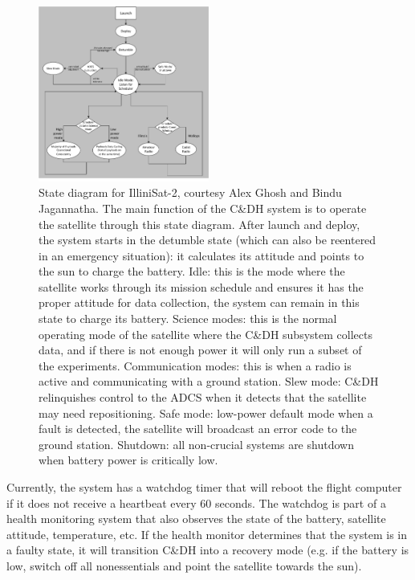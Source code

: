 \begin{figure}
  \centering
  \includegraphics[width=0.5\textwidth]{images/state_machine}
  \caption{State diagram for IlliniSat-2, courtesy Alex Ghosh and Bindu
  Jagannatha. The main function of the C\&DH system is to operate the satellite
  through this state diagram. After launch and deploy, the system starts in the
  detumble state (which can also be reentered in an emergency situation): it
  calculates its attitude and points to the sun to charge the battery.  Idle:
  this is the mode where the satellite works through its mission schedule and
  ensures it has the proper attitude for data collection, the system can remain
  in this state to charge its battery.  Science modes: this is the normal
  operating mode of the satellite where the C\&DH subsystem collects data, and
  if there is not enough power it will only run a subset of the experiments.
  Communication modes: this is when a radio is active and communicating with a
  ground station. Slew mode: C\&DH relinquishes control to the ADCS when it
  detects that the satellite may need repositioning.  Safe mode: low-power
  default mode when a fault is detected, the satellite will broadcast an error
  code to the ground station.  Shutdown: all non-crucial systems are shutdown
  when battery power is critically low.  }\label{fig:state_machine}
\end{figure}

Currently, the system has a watchdog timer that will reboot the flight computer
if it does not receive a heartbeat every 60 seconds.  The watchdog is part of a
health monitoring system that also observes the state of the battery, satellite
attitude, temperature, etc. If the health monitor determines that the system is
in a faulty state, it will transition C\&DH into a recovery mode (e.g. if the
battery is low, switch off all nonessentials and point the satellite towards the
sun).

